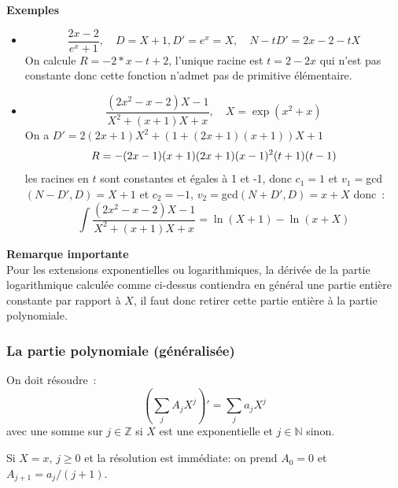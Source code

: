 \documentclass[a4paper,11pt]{article}
\begin{document}
\begin{giacjshere}
{\bf Exemples}
\begin{itemize}
\item
\[ \frac{2x-2}{e^x+1}, \quad D=X+1, D'=e^x=X, \quad N-tD'=2x-2-tX \]
On calcule $R=-2*x-t+2$, l'unique racine est $t=2-2x$ qui n'est
pas constante donc cette fonction n'admet pas de primitive élémentaire.
\item 
\[ \frac{(2x^2-x-2)X-1}{X^2+(x+1)X+x}, \quad X=\exp(x^2+x)\]
On a $D'=2(2x+1)X^2+(1+(2x+1)(x+1))X+1$
\[ R=-(2\*x-1)\*(x+1)\*(2\*x+1)\*(x-1)^2\*(t+1)\*(t-1) \]
les racines en $t$ sont constantes et égales à 1 et -1, donc $c_1=1$
et $v_1=$gcd$(N-D',D)=X+1$ et $c_2=-1$, $v_2=$gcd$(N+D',D)=x+X$
donc~:
\[ \int \frac{(2x^2-x-2)X-1}{X^2+(x+1)X+x} = \ln(X+1)-\ln(x+X)\]
\end{itemize}

{\bf Remarque importante}\\
Pour les extensions exponentielles ou logarithmiques, 
la d\'eriv\'ee de la partie logarithmique
calcul\'ee comme ci-dessus contiendra en g\'en\'eral 
une partie enti\`ere constante par rapport \`a $X$, il faut
donc retirer cette partie enti\`ere \`a la partie polynomiale.

\subsubsection{La partie polynomiale (généralisée)}
On doit résoudre~:
\[ (\sum_j A_j X^j)'=\sum_j a_j X^j \]
avec une somme sur $j \in\mathbb{Z}$ si $X$ est une exponentielle et
$j\in \mathbb{N}$ sinon.

Si $X=x$, $j\geq 0$ et la résolution est immédiate: on prend $A_0=0$ et 
$A_{j+1}=a_{j}/(j+1)$.


\end{giacjshere}
\end{document}
